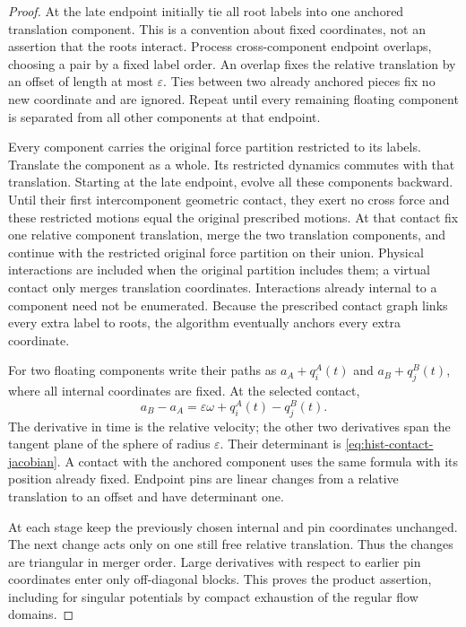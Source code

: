 \begin{proof}
At the late endpoint initially tie all root labels into one anchored
translation component.  This is a convention about fixed coordinates,
not an assertion that the roots interact.  Process cross-component
endpoint overlaps, choosing a pair by a fixed label order.  An overlap
fixes the relative translation by an offset of length at most
$\varepsilon$.  Ties between two already anchored pieces fix no new
coordinate and are ignored.  Repeat until every remaining floating
component is separated from all other components at that endpoint.

Every component carries the original force partition restricted to its
labels.  Translate the component as a whole.  Its restricted dynamics
commutes with that translation.  Starting at the late endpoint, evolve
all these components backward.  Until their first intercomponent
geometric contact, they exert no cross force and these restricted
motions equal the original prescribed motions.  At that contact fix
one relative component translation, merge the two translation
components, and continue with the restricted original force partition
on their union.  Physical interactions are included when the original
partition includes them; a virtual contact only merges translation
coordinates.  Interactions already internal to a component need not
be enumerated.  Because the prescribed contact graph links every
extra label to roots, the algorithm eventually anchors every extra
coordinate.

For two floating components write their paths as
$a_A+q_i^A(t)$ and $a_B+q_j^B(t)$, where all internal coordinates are
fixed.  At the selected contact,
\[
 a_B-a_A=\varepsilon\omega+q_i^A(t)-q_j^B(t).
\]
The derivative in time is the relative velocity; the other two
derivatives span the tangent plane of the sphere of radius
$\varepsilon$.  Their determinant is
\eqref{eq:hist-contact-jacobian}.  A contact with the anchored component
uses the same formula with its position already fixed.  Endpoint pins
are linear changes from a relative translation to an offset and have
determinant one.

At each stage keep the previously chosen internal and pin coordinates
unchanged.  The next change acts only on one still free relative
translation.  Thus the changes are triangular in merger order.  Large
derivatives with respect to earlier pin coordinates enter only
off-diagonal blocks.  This proves the product assertion, including
for singular potentials by compact exhaustion of the regular flow
domains.


\end{proof}
